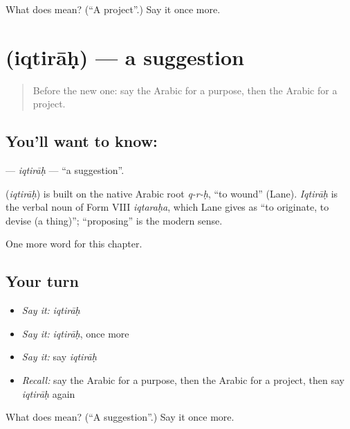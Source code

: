 \begin{tcolorbox}[breakable,colback=teal!4,colframe=teal!35!black,title={Before you move on}]
What does  mean? (\textquotedblleft{}A project\textquotedblright{}.) Say it once more.
\end{tcolorbox}
\section[\texorpdfstring{\ar{اقتراح} (iqtirāḥ)}{اقتراح (iqtirāḥ)}]{ (iqtirāḥ) — a suggestion}

\label{lesson:AR-C112-iqtirah}



\begin{quote}
Before the new one: say the Arabic for a purpose, then the Arabic for a project.
\end{quote}

\subsection*{You'll want to know: }
\textbf{} — \emph{iqtirāḥ} — \textquotedblleft{}a suggestion\textquotedblright{}.

\begin{cousinweb}
\textbf{} (\emph{iqtirāḥ}) is built on the native Arabic root \emph{q-r-ḥ}, \textquotedblleft{}to wound\textquotedblright{} (Lane). \emph{Iqtirāḥ} is the verbal noun of Form VIII \emph{iqtaraḥa}, which Lane gives as \textquotedblleft{}to originate, to devise (a thing)\textquotedblright{}; \textquotedblleft{}proposing\textquotedblright{} is the modern sense.
\end{cousinweb}

\begin{grammarlens}[title={What you've built}]
One more word for this chapter.
\end{grammarlens}

\subsection*{Your turn}
\begin{itemize}
\raggedright
  \item \emph{Say it:} \emph{iqtirāḥ}
  \item \emph{Say it:} \emph{iqtirāḥ}, once more
  \item \emph{Say it:} say \emph{iqtirāḥ}
  \item \emph{Recall:} say the Arabic for a purpose, then the Arabic for a project, then say \emph{iqtirāḥ} again
\end{itemize}

\begin{tcolorbox}[breakable,colback=teal!4,colframe=teal!35!black,title={Before you move on}]
What does  mean? (\textquotedblleft{}A suggestion\textquotedblright{}.) Say it once more.
\end{tcolorbox}
